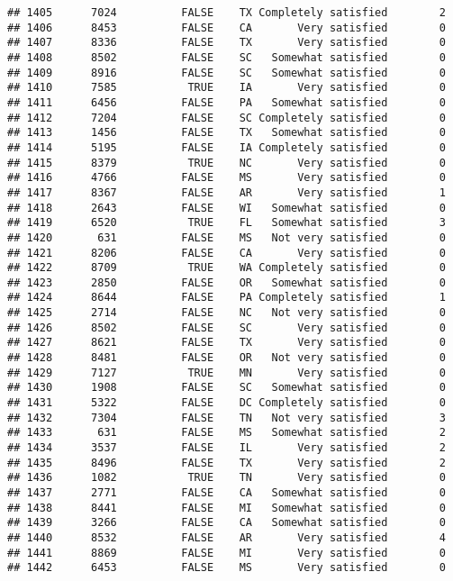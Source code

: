 \documentclass[]{book}
\theoremstyle{definition}
\theoremstyle{definition}
\theoremstyle{remark}
\begin{document}
\begin{verbatim}
## 1405      7024          FALSE    TX Completely satisfied        2
## 1406      8453          FALSE    CA       Very satisfied        0
## 1407      8336          FALSE    TX       Very satisfied        0
## 1408      8502          FALSE    SC   Somewhat satisfied        0
## 1409      8916          FALSE    SC   Somewhat satisfied        0
## 1410      7585           TRUE    IA       Very satisfied        0
## 1411      6456          FALSE    PA   Somewhat satisfied        0
## 1412      7204          FALSE    SC Completely satisfied        0
## 1413      1456          FALSE    TX   Somewhat satisfied        0
## 1414      5195          FALSE    IA Completely satisfied        0
## 1415      8379           TRUE    NC       Very satisfied        0
## 1416      4766          FALSE    MS       Very satisfied        0
## 1417      8367          FALSE    AR       Very satisfied        1
## 1418      2643          FALSE    WI   Somewhat satisfied        0
## 1419      6520           TRUE    FL   Somewhat satisfied        3
## 1420       631          FALSE    MS   Not very satisfied        0
## 1421      8206          FALSE    CA       Very satisfied        0
## 1422      8709           TRUE    WA Completely satisfied        0
## 1423      2850          FALSE    OR   Somewhat satisfied        0
## 1424      8644          FALSE    PA Completely satisfied        1
## 1425      2714          FALSE    NC   Not very satisfied        0
## 1426      8502          FALSE    SC       Very satisfied        0
## 1427      8621          FALSE    TX       Very satisfied        0
## 1428      8481          FALSE    OR   Not very satisfied        0
## 1429      7127           TRUE    MN       Very satisfied        0
## 1430      1908          FALSE    SC   Somewhat satisfied        0
## 1431      5322          FALSE    DC Completely satisfied        0
## 1432      7304          FALSE    TN   Not very satisfied        3
## 1433       631          FALSE    MS   Somewhat satisfied        2
## 1434      3537          FALSE    IL       Very satisfied        2
## 1435      8496          FALSE    TX       Very satisfied        2
## 1436      1082           TRUE    TN       Very satisfied        0
## 1437      2771          FALSE    CA   Somewhat satisfied        0
## 1438      8441          FALSE    MI   Somewhat satisfied        0
## 1439      3266          FALSE    CA   Somewhat satisfied        0
## 1440      8532          FALSE    AR       Very satisfied        4
## 1441      8869          FALSE    MI       Very satisfied        0
## 1442      6453          FALSE    MS       Very satisfied        0

\end{verbatim}
\end{document}

